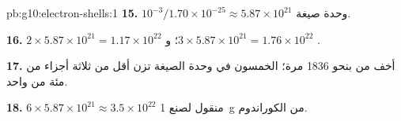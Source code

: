 \begin{solution}{pb:g10:electron-shells:1}
\textbf{15.} $10^{-3} / 1.70 \times 10^{-25} \approx 5.87 \times 10^{21}$
وحدة صيغة.

\textbf{16.} $2 \times 5.87 \times 10^{21} = 1.17 \times 10^{22}$ 
؛ و$3 \times 5.87 \times 10^{21} = 1.76 \times 10^{22}$ 
.

\textbf{17.}  أخف من  بنحو 1836 مرة؛  الخمسون
في وحدة الصيغة تزن أقل من ثلاثة أجزاء من مئة من 
واحد.

\textbf{18.} $6 \times 5.87 \times 10^{21} \approx 3.5 \times 10^{22}$
 منقول لصنع \qty{1}{g} من الكوراندوم.
\end{solution}
